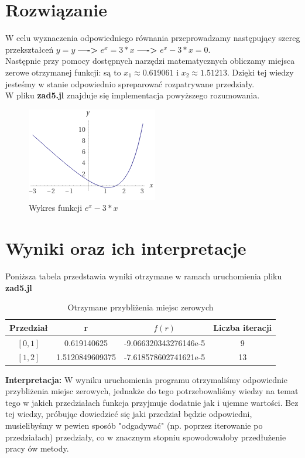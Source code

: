 \documentclass[a4paper,14pt]{report}
\begin{document}
  \section{Rozwiązanie}
    W celu wyznaczenia odpowiedniego równania przeprowadzamy następujący szereg przekształceń
    $y=y$ \textbf{---->} $e^{x}=3*x$ \textbf{---->} $e^{x}-3*x=0 $.\\
    Następnie przy pomocy dostępnych narzędzi matematycznych obliczamy miejsca zerowe otrzymanej funkcji: są to $x_{1} \approx 0.619061$ i $x_{2} \approx 1.51213 $. Dzięki tej wiedzy jesteśmy w stanie odpowiednio spreparować rozpatrywane przedziały. \\
    W pliku \textbf{zad5.jl} znajduje się implementacja powyższego rozumowania. 
    \begin{figure}[H]
      \includegraphics[scale=1.0]{zad5}
      \centering
      \caption{Wykres funkcji $e^{x}-3*x$}
    \end{figure}
  \section{Wyniki oraz ich interpretacje}
    Poniższa tabela przedstawia wyniki otrzymane w ramach uruchomienia pliku \textbf{zad5.jl} \\

    \begin{table}[H]
    \centering
    \begin{tabular}{|c | c | c | c |} 
     \hline
     Przedział & r & $f(r)$ & Liczba iteracji \\ [0.5ex] 
     \hline\hline
     $[0,1]$ & 0.619140625 & -9.066320343276146e-5 & 9  \\ 
     $[1,2]$ & 1.5120849609375 & -7.618578602741621e-5 & 13 \\
     \hline
    \end{tabular}
    \caption{Otrzymane przybliżenia miejsc zerowych}
    \label{Zad5Wyniki}
    \end{table}
    \textbf{Interpretacja: } W wyniku uruchomienia programu otrzymaliśmy odpowiednie przybliżenia miejsc zerowych, jednakże do tego potrzebowaliśmy wiedzy na temat tego w jakich przedziałach funkcja przyjmuje dodatnie jak i ujemne wartości. Bez tej wiedzy, próbując dowiedzieć się jaki przedział będzie odpowiedni, musielibyśmy w pewien sposób "odgadywać" (np. poprzez iterowanie po przedziałach) przedziały, co w znacznym stopniu spowodowałoby przedłużenie pracy ów metody.
\end{document}
